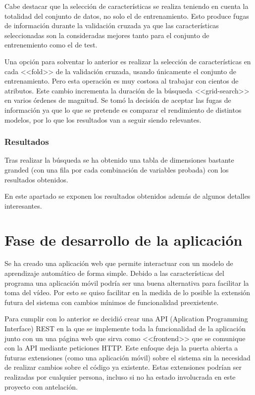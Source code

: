 Cabe destacar que la selección de características se realiza teniendo en cuenta
la totalidad del conjunto de datos, no solo el de entrenamiento. Esto produce
fugas de información durante la validación cruzada ya que las características
seleccionadas son la consideradas mejores tanto para el conjunto de
entrenemiento como el de test.

Una opción para solventar lo anterior es realizar la selección de
características en cada <<fold>> de la validación cruzada, usando únicamente el
conjunto de entrenamiento. Pero esta operación es muy costosa al trabajar con
cientos de atributos. Este cambio incrementa la duración de la búsqueda
<<grid-search>> en varios órdenes de magnitud. Se tomó la decisión de aceptar
las fugas de información ya que lo que se pretende es comparar el rendimiento de
distintos modelos, por lo que los resultados van a seguir siendo relevantes.

\subsubsection{Resultados}

Tras realizar la búsqueda se ha obtenido una tabla de dimensiones bastante
granded (con una fila por cada combinación de variables probada) con los
resultados obtenidos.

En este apartado se exponen los resultados obtenidos además de algunos detalles
interesantes.



\section{Fase de desarrollo de la aplicación}

Se ha creado una aplicación web que permite interactuar con un modelo de
aprendizaje automático de forma simple. Debido a las características del
programa una aplicación móvil podría ser una buena alternativa para facilitar la
toma del vídeo. Por esto se quiso facilitar en la medida de lo posible la
extensión futura del sistema con cambios mínimos de funcionalidad preexistente.

Para cumplir con lo anterior se decidió crear una API (Aplication Programming
Interface) REST en la que se implemente toda la funcionalidad de la aplicación
junto con un una página web que sirva como <<frontend>> que se comunique con la
API mediante peticiones HTTP. Este enfoque deja la puerta abierta a futuras
extensiones (como una aplicación móvil) sobre el sistema sin la necesidad de
realizar cambios sobre el código ya existente. Estas extensiones podrían ser
realizadas por cualquier persona, incluso si no ha estado involucrada en este
proyecto con antelación.

